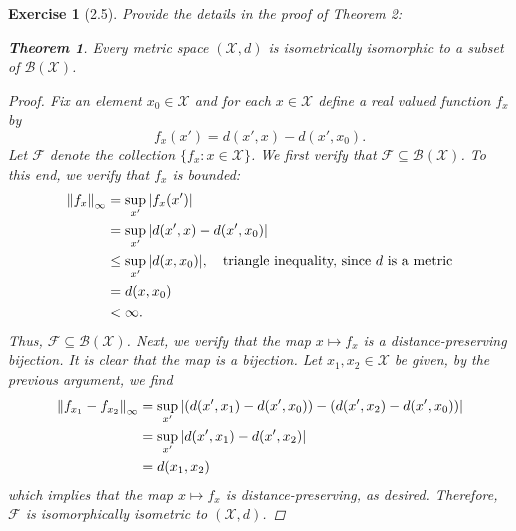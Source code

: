 \documentclass[11pt]{article}
\newtheorem{theorem}{Theorem}[section]
\newtheorem{exercise}{Exercise}
\begin{document}
\begin{exercise}[2.5]
	Provide the details in the proof of Theorem 2:
	\begin{theorem}
		Every metric space $(\mathcal{X},d)$ is isometrically isomorphic to a subset of $\mathcal{B}(\mathcal{X})$.
	\end{theorem}

	\begin{proof}
		Fix an element $x_0 \in \mathcal{X}$ and for each $x\in \mathcal{X}$ define a real valued function $f_x$ by 
		\begin{equation*}
		f_x(x') = d(x',x) - d(x',x_0).
		\end{equation*}
		Let $\mathcal{F}$ denote the collection $ \{ f_x : x\in \mathcal{X} \}$. We first verify that $\mathcal{F} \subseteq \mathcal{B}(\mathcal{X})$. To this end, we verify that $f_x$ is bounded:
		\begin{align*}
		\norm{f_x}_\infty &= \sup_{x'}\abs{f_x(x')} \\
		&= \sup_{x'}\abs{d(x',x) - d(x',x_0)} \\
		&\leq \sup_{x'}  \abs{d(x,x_0)},  \quad \mbox{triangle inequality, since $d$ is a metric} \\
		&= d(x,x_0)\\
		&< \infty.
		\end{align*}
		Thus, $\mathcal{F} \subseteq \mathcal{B}(\mathcal{X})$. Next, we verify that the map $x \mapsto f_x$ is a distance-preserving bijection. It is clear that the map is a bijection. Let $x_1, x_2 \in \mathcal{X}$ be given, by the previous argument, we find
		\begin{align*}
		\norm{f_{x_1} - f_{x_2}}_\infty 
		&= \sup_{x'} \abs{(d(x',x_1) - d(x',x_0)) - (d(x',x_2) - d(x',x_0))} \\
		&= \sup_{x'}\abs{d(x',x_1) - d(x',x_2)} \\
		&= d(x_1,x_2) 
		\end{align*} 
		which implies that the map $x\mapsto f_x$ is distance-preserving, as desired. Therefore, $\mathcal{F}$ is isomorphically isometric to $(\mathcal{X},d)$. 
	\end{proof}
\end{exercise}
\end{document}
